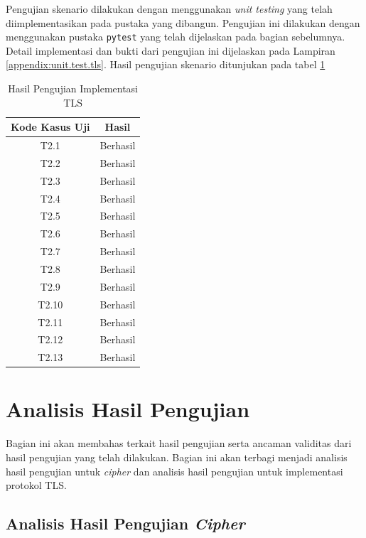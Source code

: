 Pengujian skenario dilakukan dengan menggunakan \emph{unit testing} yang telah diimplementasikan pada pustaka yang dibangun. Pengujian ini dilakukan dengan menggunakan pustaka \texttt{pytest} yang telah dijelaskan pada bagian sebelumnya. Detail implementasi dan bukti dari pengujian ini dijelaskan pada Lampiran \ref{appendix:unit.test.tls}. Hasil pengujian skenario ditunjukan pada tabel \ref{tab:test.result.tls}

\begin{table}[!h]
  \centering
  \caption{Hasil Pengujian Implementasi TLS} \label{tab:test.result.tls}
  \begin{tabular}{|c|c|}
    \hline
    Kode Kasus Uji & Hasil \\ \hline
    T2.1 & Berhasil \\ \hline
    T2.2 & Berhasil \\ \hline
    T2.3 & Berhasil \\ \hline
    T2.4 & Berhasil \\ \hline
    T2.5 & Berhasil \\ \hline
    T2.6 & Berhasil \\ \hline
    T2.7 & Berhasil \\ \hline
    T2.8 & Berhasil \\ \hline
    T2.9 & Berhasil \\ \hline
    T2.10 & Berhasil \\ \hline
    T2.11 & Berhasil \\ \hline
    T2.12 & Berhasil \\ \hline
    T2.13 & Berhasil \\ \hline
  \end{tabular}
\end{table}

\section{Analisis Hasil Pengujian} 
\label{sec:analisis-hasil-pengujian}

Bagian ini akan membahas terkait hasil pengujian serta ancaman validitas dari hasil pengujian yang telah dilakukan. Bagian ini akan terbagi menjadi analisis hasil pengujian untuk \emph{cipher} dan analisis hasil pengujian untuk implementasi protokol TLS.

\subsection{Analisis Hasil Pengujian \emph{Cipher}}

